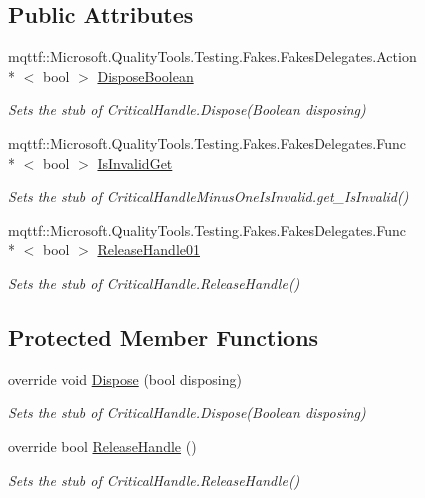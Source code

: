 \subsection*{Public Attributes}
\begin{DoxyCompactItemize}
\item 
mqttf\-::\-Microsoft.\-Quality\-Tools.\-Testing.\-Fakes.\-Fakes\-Delegates.\-Action\\*
$<$ bool $>$ \hyperlink{class_microsoft_1_1_win32_1_1_safe_handles_1_1_fakes_1_1_stub_critical_handle_minus_one_is_invalid_af040689143ebc33c0efa055b356bae22}{Dispose\-Boolean}
\begin{DoxyCompactList}\small\item\em Sets the stub of Critical\-Handle.\-Dispose(\-Boolean disposing)\end{DoxyCompactList}\item 
mqttf\-::\-Microsoft.\-Quality\-Tools.\-Testing.\-Fakes.\-Fakes\-Delegates.\-Func\\*
$<$ bool $>$ \hyperlink{class_microsoft_1_1_win32_1_1_safe_handles_1_1_fakes_1_1_stub_critical_handle_minus_one_is_invalid_a871df37df84fb84327f84e8e8fe8ba47}{Is\-Invalid\-Get}
\begin{DoxyCompactList}\small\item\em Sets the stub of Critical\-Handle\-Minus\-One\-Is\-Invalid.\-get\-\_\-\-Is\-Invalid()\end{DoxyCompactList}\item 
mqttf\-::\-Microsoft.\-Quality\-Tools.\-Testing.\-Fakes.\-Fakes\-Delegates.\-Func\\*
$<$ bool $>$ \hyperlink{class_microsoft_1_1_win32_1_1_safe_handles_1_1_fakes_1_1_stub_critical_handle_minus_one_is_invalid_a150400a0c88f392d43ff39738186f91c}{Release\-Handle01}
\begin{DoxyCompactList}\small\item\em Sets the stub of Critical\-Handle.\-Release\-Handle()\end{DoxyCompactList}\end{DoxyCompactItemize}
\subsection*{Protected Member Functions}
\begin{DoxyCompactItemize}
\item 
override void \hyperlink{class_microsoft_1_1_win32_1_1_safe_handles_1_1_fakes_1_1_stub_critical_handle_minus_one_is_invalid_a0527fce99956cb1db17fe4cc6b1607e5}{Dispose} (bool disposing)
\begin{DoxyCompactList}\small\item\em Sets the stub of Critical\-Handle.\-Dispose(\-Boolean disposing)\end{DoxyCompactList}\item 
override bool \hyperlink{class_microsoft_1_1_win32_1_1_safe_handles_1_1_fakes_1_1_stub_critical_handle_minus_one_is_invalid_ab0ab76daa7551d56f032004feee3aca0}{Release\-Handle} ()
\begin{DoxyCompactList}\small\item\em Sets the stub of Critical\-Handle.\-Release\-Handle()\end{DoxyCompactList}\end{DoxyCompactItemize}
